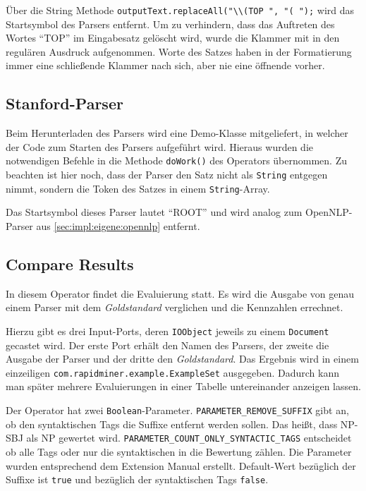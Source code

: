 Über die String Methode \texttt{outputText.replaceAll("\textbackslash \textbackslash (TOP ", "( ");} wird das Startsymbol des Parsers entfernt. Um zu verhindern, dass das Auftreten des Wortes ``TOP'' im Eingabesatz gelöscht wird, wurde die Klammer mit in den regulären Ausdruck aufgenommen. Worte des Satzes haben in der Formatierung immer eine schließende Klammer nach sich, aber nie eine öffnende vorher.

\subsection{Stanford-Parser}

Beim Herunterladen des Parsers wird eine Demo-Klasse mitgeliefert, in welcher der Code zum Starten des Parsers aufgeführt wird. Hieraus wurden die notwendigen Befehle in die Methode \texttt{doWork()} des Operators übernommen. Zu beachten ist hier noch, dass der Parser den Satz nicht als \texttt{String} entgegen nimmt, sondern die Token des Satzes in einem \texttt{String}-Array.

Das Startsymbol dieses Parser lautet ``ROOT'' und wird analog zum OpenNLP-Parser aus \ref{sec:impl:eigene:opennlp} entfernt.

\subsection{Compare Results}

In diesem Operator findet die Evaluierung statt. Es wird die Ausgabe von genau einem Parser mit dem \textit{Goldstandard} verglichen und die Kennzahlen errechnet.

Hierzu gibt es drei Input-Ports, deren \texttt{IOObject} jeweils zu einem \texttt{Document} gecastet wird. Der erste Port erhält den Namen des Parsers, der zweite die Ausgabe der Parser und der dritte den \textit{Goldstandard}. Das Ergebnis wird in einem einzeiligen  \texttt{com.rapidminer.example.ExampleSet} ausgegeben. Dadurch kann man später mehrere Evaluierungen in einer Tabelle untereinander anzeigen lassen. 

Der Operator hat zwei \texttt{Boolean}-Parameter. \texttt{PARAMETER\_REMOVE\_SUFFIX} gibt an, ob den syntaktischen Tags die Suffixe entfernt werden sollen. Das heißt, dass NP-SBJ als NP gewertet wird. \texttt{PARAMETER\_COUNT\_ONLY\_SYNTACTIC\_TAGS} entscheidet ob alle Tags oder nur die syntaktischen in die Bewertung zählen. Die Parameter wurden entsprechend dem Extension Manual \cite{rmguide} %
erstellt. Default-Wert bezüglich der Suffixe ist \texttt{true} und bezüglich der syntaktischen Tags \texttt{false}.

